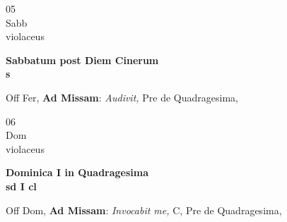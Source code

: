 \documentclass[10pt, openany]{book}
\begin{document}
        \begin{center}
            \begin{minipage}{3.5in}
                \vspace{2em}
                \begin{minipage}{0.5in}
                    {\Huge 05} \\
                    {\normalsize Sabb} \\
                    {\normalsize violaceus}
                \end{minipage}
                \begin{minipage}{3.0in}
                    \textbf{ \large Sabbatum post Diem Cinerum \\
                    \textnormal{\normalsize s}} \\ 
                \end{minipage}
                \begin{justify}Off Fer, \textbf{Ad Missam}: \textit{Audivit,} Pre de Quadragesima,   
                \end{justify}
            \end{minipage}
        \end{center}
    
        \begin{center}
            \begin{minipage}{3.5in}
                \vspace{2em}
                \begin{minipage}{0.5in}
                    {\Huge 06} \\
                    {\normalsize Dom} \\
                    {\normalsize violaceus}
                \end{minipage}
                \begin{minipage}{3.0in}
                    \textbf{ \large Dominica I in Quadragesima \\
                    \textnormal{\normalsize sd I cl}} \\ 
                \end{minipage}
                \begin{justify}Off Dom, \textbf{Ad Missam}: \textit{Invocabit me,} C, Pre de Quadragesima,   
                \end{justify}
            \end{minipage}
        \end{center}
    
\end{document}
